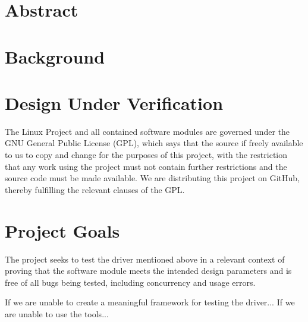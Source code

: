 \documentclass{article}
\begin{document}
    \section{Abstract}
    
    
    \section{Background}
    
    
    
    \section{Design Under Verification}
    
    \par
    The Linux Project and all contained software modules are governed under the GNU General
    Public License (GPL), which says that the source if freely available to us to copy and change
    for the purposes of this project, with the restriction that any work using the project
    must not contain further restrictions and the source code must be made available.
    We are distributing this project on GitHub, thereby fulfilling the relevant clauses of the GPL.

    \section{Project Goals}
    The project seeks to test the driver mentioned above in a relevant context of proving
    that the software module meets the intended design parameters and is free of all bugs
    being tested, including concurrency and usage errors.
    \par
    If we are unable to create a meaningful framework for testing the driver...
    If we are unable to use the tools...
    
    \pagebreak
    \small
    {}
    
\end{document}
